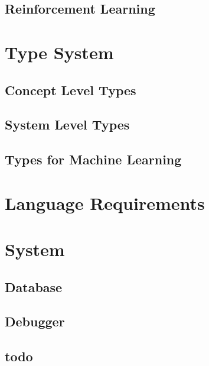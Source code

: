 \documentclass[11pt, oneside]{article}   	%
\theoremstyle{definition}
\begin{document}
\subsection{Reinforcement Learning}


\section{Type System}

\subsection{Concept Level Types}


\subsection{System Level Types}

\subsection{Types for Machine Learning}

\section{Language Requirements}

\section{System}

\subsection{Database}

\subsection{Debugger}

\subsection{todo}
\end{document}
